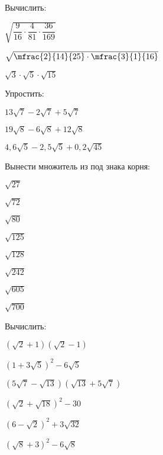 \begin{homework}[number=2]
	\begin{listofex}
		\item Вычислить:
		\begin{enumcols}[itemcolumns=3] 
			\item {}
			\item {}
			\item {}
			\item \( \sqrt{\dfrac{9}{16}\cdot\dfrac{4}{81}\cdot\dfrac{36}{169}} \)
			\item \( \sqrt{\mfrac{2}{14}{25}\cdot\mfrac{3}{1}{16}} \)
			\item \( \sqrt{3}\cdot\sqrt{5}\cdot\sqrt{15} \)
		\end{enumcols}
	\item Упростить:
		\begin{enumcols}[itemcolumns=2]
			\item \( 13\sqrt{7}-2\sqrt{7}+5\sqrt{7} \)
			\item \( 19\sqrt{8}-6\sqrt{8}+12\sqrt{8} \)
			\item \( 4,6\sqrt{5}-2,5\sqrt{5}+0,2\sqrt{45} \)
			\item {}
		\end{enumcols} 
	\item Вынести множитель из под знака корня:
	\begin{enumcols}[itemcolumns=8]
		\item \( \sqrt{27} \)
		\item \( \sqrt{72} \)
		\item \( \sqrt{80} \)
		\item \( \sqrt{125} \)
		\item \( \sqrt{128} \)
		\item \( \sqrt{242} \)
		\item \( \sqrt{605} \)
		\item \( \sqrt{700} \)
	\end{enumcols} 
	\item Вычислить:
	\begin{enumcols}[itemcolumns=2]
		\item \( (\sqrt{2}+1)(\sqrt{2}-1) \)
		\item \( (1+3\sqrt{5})^2-6\sqrt{5} \)
		\item \( (5\sqrt{7}-\sqrt{13})(\sqrt{13}+5\sqrt{7}) \)
		\item \( (\sqrt{2}+\sqrt{18})^2-30 \)
		\item \( (6-\sqrt{2})^2+3\sqrt{32} \)
		\item \( (\sqrt{8}+3)^2-6\sqrt{8} \)
	\end{enumcols} 
	\end{listofex}
\end{homework}
